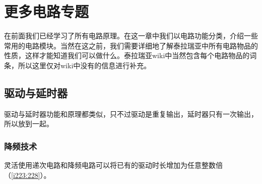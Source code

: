 \chapter{更多电路专题}

在前面我们已经学习了所有电路原理。在这一章中我们以电路功能分类，介绍一些常用的电路模块。当然在这之前，我们需要详细地了解泰拉瑞亚中所有电路物品的性质，这样才能知道我们可以做什么。泰拉瑞亚wiki中当然包含每个电路物品的词条，所以这里仅对wiki中没有的信息进行补充。

\section{驱动与延时器}

驱动与延时器功能和原理都类似，只不过驱动是重复输出，延时器只有一次输出，所以放到一起。

\subsection{降频技术}
灵活使用递次电路和降频电路可以将已有的驱动时长增加为任意整数倍（\autoref{i223:228}）。

